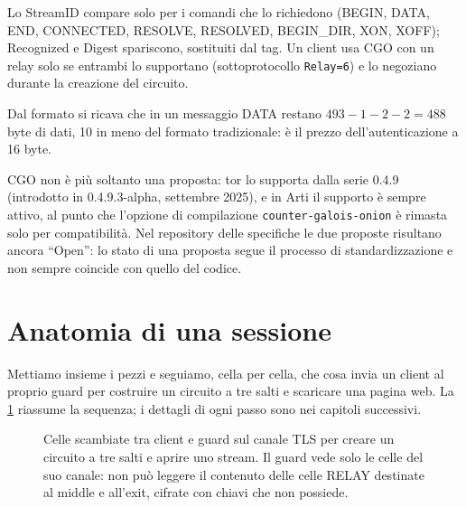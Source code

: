 Lo StreamID compare solo per i comandi che lo richiedono (BEGIN, DATA, END, CONNECTED, RESOLVE, RESOLVED, BEGIN\_DIR, XON, XOFF); Recognized e Digest spariscono, sostituiti dal tag. Un client usa CGO con un relay solo se entrambi lo supportano (sottoprotocollo \texttt{Relay=6}) e lo negoziano durante la creazione del circuito.

\begin{approfondimento}
Dal formato si ricava che in un messaggio DATA restano $493 - 1 - 2 - 2 = 488$ byte di dati, 10 in meno del formato tradizionale: è il prezzo dell'autenticazione a 16 byte.
\end{approfondimento}

CGO non è più soltanto una proposta: tor lo supporta dalla serie 0.4.9 (introdotto in 0.4.9.3-alpha, settembre 2025), e in Arti il supporto è sempre attivo, al punto che l'opzione di compilazione \texttt{counter-galois-onion} è rimasta solo per compatibilità. Nel repository delle specifiche le due proposte risultano ancora \enquote{Open}: lo stato di una proposta segue il processo di standardizzazione e non sempre coincide con quello del codice.

\section{Anatomia di una sessione}\label{sec:sessione}

Mettiamo insieme i pezzi e seguiamo, cella per cella, che cosa invia un client al proprio guard per costruire un circuito a tre salti e scaricare una pagina web. La \cref{fig:sessione} riassume la sequenza; i dettagli di ogni passo sono nei capitoli successivi.

\begin{figure}[htbp]
\centering

\caption{Celle scambiate tra client e guard sul canale TLS per creare un circuito a tre salti e aprire uno stream. Il guard vede solo le celle del suo canale: non può leggere il contenuto delle celle RELAY destinate al middle e all'exit, cifrate con chiavi che non possiede.}
\label{fig:sessione}
\end{figure}

